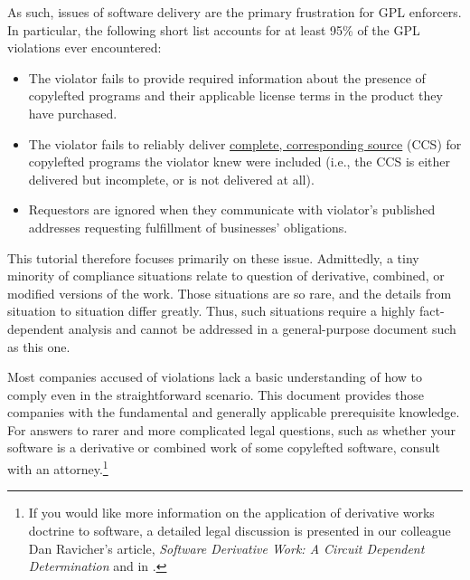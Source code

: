 As such, issues of software delivery are the primary frustration for GPL
enforcers. In particular, the following short list accounts for at least 95\%
of the GPL violations ever encountered:

\begin{itemize}

\item The violator fails to provide required information about the presence
  of copylefted programs and their applicable license terms in the product
  they have purchased.

\item The violator fails to reliably deliver \hyperref[CCS
  Definition]{complete, corresponding source} (CCS) for copylefted programs
  the violator knew were included (i.e., the CCS is either delivered but
  incomplete, or is not delivered at all).

\item Requestors are ignored when they communicate with violator's published
  addresses requesting fulfillment of businesses' obligations.
\end{itemize}

This tutorial therefore focuses primarily on these issue.
Admittedly, a tiny
minority of compliance situations relate to question of derivative,
combined, or modified versions of the work.  Those
situations are so rare, and the details from situation to situation differ
greatly.  Thus, such situations require a highly
fact-dependent analysis and cannot be addressed in a general-purpose
document such as this one.

\medskip

Most companies accused of violations lack a basic understanding
of how to comply even in the straightforward scenario.  This document
provides those companies with the fundamental and generally applicable prerequisite knowledge.
For answers to rarer and more complicated legal questions, such as whether
your software is a derivative or combined work of some copylefted software, consult
with an attorney.\footnote{If you would like more information on the
  application of derivative works doctrine to software, a detailed legal
  discussion is presented in our colleague Dan Ravicher's article,
  \textit{Software Derivative Work: A Circuit Dependent Determination} and in
  .}

